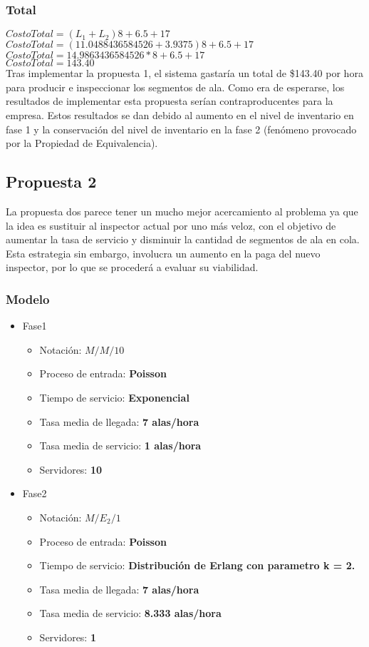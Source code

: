 \documentclass{article}
\begin{document}
\subsubsection{Total}
\noindent $CostoTotal = \left( L_{1} + L_{2} \right) 8 + 6.5 + 17$ \\
$CostoTotal = \left( 11.0488436584526 + 3.9375\right) 8 + 6.5 + 17$ \\
$CostoTotal = 14.9863436584526*8 + 6.5 + 17$\\
$CostoTotal = 143.40 $\\
Tras implementar la propuesta 1, el sistema gastaría un total de 
\$143.40 por hora para producir e inspeccionar
los segmentos de ala. Como era de esperarse, los resultados de implementar esta
propuesta serían contraproducentes para la empresa. Estos resultados se dan debido
al aumento en el nivel de inventario en fase 1 y la conservación del nivel de 
inventario en la fase 2 (fenómeno provocado por la Propiedad de Equivalencia).
\subsection{Propuesta 2}
La propuesta dos parece tener un mucho mejor acercamiento al problema ya 
que la idea es sustituir al inspector actual por uno más veloz, con el 
objetivo de aumentar la tasa de servicio y disminuir la cantidad de segmentos 
de ala en cola. Esta estrategia sin embargo, involucra un aumento en la paga del
nuevo inspector, por lo que se procederá a evaluar su viabilidad.
\subsubsection{Modelo}
\begin{itemize}
	\item Fase1
		\begin{itemize}
			\item \large{Notación: } \textbf{$M/M/10$}
			\item \large{Proceso de entrada: } \textbf{Poisson}
			\item \large{Tiempo de servicio: } \textbf{Exponencial}
			\item \large{Tasa media de llegada: } \textbf{7 alas/hora}
			\item \large{Tasa media de servicio: } \textbf{1 alas/hora}
			\item \large{Servidores: } \textbf{10}
		\end{itemize}
	\item Fase2
		\begin{itemize}
			\item \large{Notación: } \textbf{$M/E_{2}/1$}
			\item \large{Proceso de entrada: } \textbf{Poisson}
			\item \large{Tiempo de servicio: } \textbf{Distribución de 
				Erlang con parametro k = 2.}
			\item \large{Tasa media de llegada: } \textbf{7 alas/hora}
			\item \large{Tasa media de servicio: } \textbf{8.333 alas/hora}
			\item \large{Servidores: } \textbf{1}
		\end{itemize}
\end{itemize}
\end{document}
